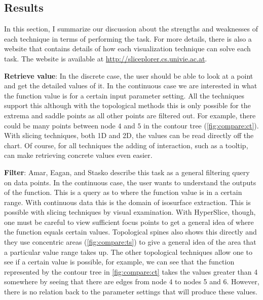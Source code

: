 \subsection{Results}\label{sec:task-solutions}

In this section, I summarize our discussion about the strengths and weaknesses
of each technique in terms of performing the task.  For more details, there is
also a website that contains details of how each visualization technique can
solve each task. The website is available at
\url{http://sliceplorer.cs.univie.ac.at}.


\textbf{Retrieve value}:\label{retrieve-value}
In the discrete case, the user should be able to look at a point and get the
detailed values of it. In the continuous case we are interested in what the
function value is for a certain input parameter setting. All the techniques
support this although with the topological methods this is only possible for
the extrema and saddle points as all other points are filtered out. For
example, there could be many points between node $4$ and $5$ in the contour
tree (\autoref{fig:compare:ct}). With
slicing techniques, both 1D and 2D, the values can be read directly off the
chart. Of course, for all techniques the adding of interaction, such as a tooltip, can make retrieving concrete values even easier. 

\textbf{Filter}:\label{filter}
Amar, Eagan, and Stasko describe this task as a general filtering query on data points.
In the continuous case, the user wants to understand the outputs of the
function. This is a query as to where the function value is in a certain range.
With continuous data this is the domain of isosurface extraction.
This is possible with slicing techniques by visual examination.
With HyperSlice, though, one must be careful to view sufficient focus points to
get a general idea of where the function equals certain values.  Topological
spines also shows this directly and they use concentric areas 
(\autoref{fig:compare:ts}) to give a
general idea of the area that a particular value range takes up. The other
topological techniques allow one to see if a certain value is possible, for
example, we can see that the function represented by the contour tree in 
\autoref{fig:compare:ct} takes the values greater than 4 somewhere by seeing 
that there are edges from node 4 to nodes 5 and 6. However,
there is no relation back to the parameter settings that will produce these
values. 

